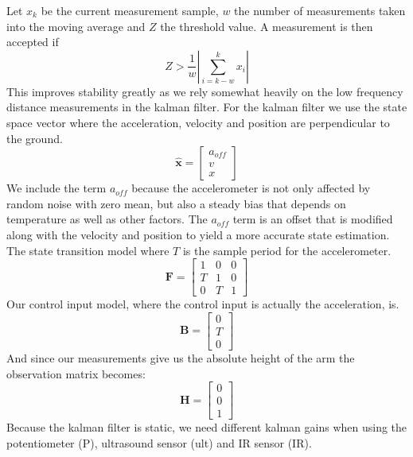 Let \(x_k\) be the current measurement sample, \(w\) the number of measurements taken into the moving average and \(Z\) the threshold value.
A measurement is then accepted if 
\begin{equation*}
	Z >\frac{1}{w} \left\lvert \sum_{i=k-w}^{k}x_i \right\rvert
\end{equation*}
This improves stability greatly as we rely somewhat heavily on the low frequency distance measurements in the kalman filter.
For the kalman filter we use the state space vector where the acceleration, velocity and position are perpendicular to the ground.
\begin{equation*}
	\hat{\mathbf{x}} = \begin{bmatrix}
		a_{off} \\
		v \\
		x
	\end{bmatrix}
\end{equation*}
We include the term \(a_{off}\) because the accelerometer is not only affected by random noise with zero mean, but also a 
steady bias that depends on temperature as well as other factors. The \(a_{off}\) term is an offset that is modified along
with the velocity and position to yield a more accurate state estimation.
The state transition model where \(T\) is the sample period for the accelerometer.
\begin{equation*}
	\mathbf{F} = \begin{bmatrix}
		1 & 0 & 0 \\
		T & 1 & 0 \\
		0 & T & 1 
	\end{bmatrix}
\end{equation*}
Our control input model, where the control input is actually the acceleration, is.
\begin{equation*}
	\mathbf{B} = \begin{bmatrix}
		0 \\
		T \\
		0 
	\end{bmatrix}
\end{equation*}
And since our measurements give us the absolute height of the arm the observation matrix becomes:
\begin{equation*}
	\mathbf{H} = \begin{bmatrix}
		0 \\
		0 \\
		1
	\end{bmatrix}
\end{equation*}
Because the kalman filter is static, we need different kalman gains when using the potentiometer (P), ultrasound sensor (ult) and IR sensor (IR).
